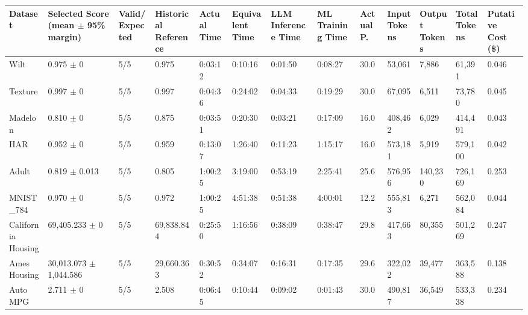 \begin{tabular}{lllllllllllll}
\hline
Dataset & Selected Score (mean \ensuremath{\pm} 95\% margin) & Valid/Expected & Historical Reference & Actual Time & Equivalent Time & LLM Inference Time & ML Training Time & Actual P. & Input Tokens & Output Tokens & Total Tokens & Putative Cost (\$) \\
\hline
Wilt & 0.975 \ensuremath{\pm} 0 & 5/5 & 0.975 & 0:03:12 & 0:10:16 & 0:01:50 & 0:08:27 & 30.0 & 53,061 & 7,886 & 61,391 & 0.046 \\
Texture & 0.997 \ensuremath{\pm} 0 & 5/5 & 0.997 & 0:04:36 & 0:24:02 & 0:04:33 & 0:19:29 & 30.0 & 67,095 & 6,511 & 73,780 & 0.045 \\
Madelon & 0.810 \ensuremath{\pm} 0 & 5/5 & 0.875 & 0:03:51 & 0:20:30 & 0:03:21 & 0:17:09 & 16.0 & 408,462 & 6,029 & 414,491 & 0.043 \\
HAR & 0.952 \ensuremath{\pm} 0 & 5/5 & 0.959 & 0:13:07 & 1:26:40 & 0:11:23 & 1:15:17 & 16.0 & 573,181 & 5,919 & 579,100 & 0.042 \\
Adult & 0.819 \ensuremath{\pm} 0.013 & 5/5 & 0.805 & 1:00:25 & 3:19:00 & 0:53:19 & 2:25:41 & 25.6 & 576,956 & 140,230 & 726,169 & 0.253 \\
MNIST\_784 & 0.970 \ensuremath{\pm} 0 & 5/5 & 0.972 & 1:00:25 & 4:51:38 & 0:51:38 & 4:00:01 & 12.2 & 555,813 & 6,271 & 562,084 & 0.044 \\
California Housing & 69,405.233 \ensuremath{\pm} 0 & 5/5 & 69,838.844 & 0:25:50 & 1:16:56 & 0:38:09 & 0:38:47 & 29.8 & 417,663 & 80,355 & 501,269 & 0.247 \\
Ames Housing & 30,013.073 \ensuremath{\pm} 1,044.586 & 5/5 & 29,660.363 & 0:30:52 & 0:34:07 & 0:16:31 & 0:17:35 & 29.6 & 322,022 & 39,477 & 363,588 & 0.138 \\
Auto MPG & 2.711 \ensuremath{\pm} 0 & 5/5 & 2.508 & 0:06:45 & 0:10:44 & 0:09:02 & 0:01:43 & 30.0 & 490,817 & 36,549 & 533,338 & 0.234 \\
\hline
\end{tabular}
